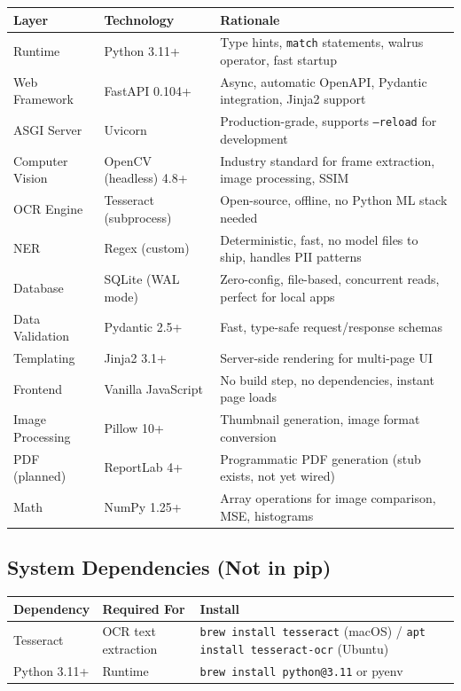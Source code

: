 \documentclass[12pt, a4paper]{article}
\newcommand{\codeinline}[1]{\texttt{\small\colorbox{codebg}{#1}}}
\begin{document}
\begin{longtable}{@{} p{3cm} p{4cm} p{7cm} @{}}
    \toprule
    \textbf{Layer} & \textbf{Technology} & \textbf{Rationale} \\
    \midrule
    \endhead
    Runtime & Python 3.11+ & Type hints, \codeinline{match} statements, walrus operator, fast startup \\
    Web Framework & FastAPI 0.104+ & Async, automatic OpenAPI, Pydantic integration, Jinja2 support \\
    ASGI Server & Uvicorn & Production-grade, supports \codeinline{--reload} for development \\
    Computer Vision & OpenCV (headless) 4.8+ & Industry standard for frame extraction, image processing, SSIM \\
    OCR Engine & Tesseract (subprocess) & Open-source, offline, no Python ML stack needed \\
    NER & Regex (custom) & Deterministic, fast, no model files to ship, handles PII patterns \\
    Database & SQLite (WAL mode) & Zero-config, file-based, concurrent reads, perfect for local apps \\
    Data Validation & Pydantic 2.5+ & Fast, type-safe request/response schemas \\
    Templating & Jinja2 3.1+ & Server-side rendering for multi-page UI \\
    Frontend & Vanilla JavaScript & No build step, no dependencies, instant page loads \\
    Image Processing & Pillow 10+ & Thumbnail generation, image format conversion \\
    PDF (planned) & ReportLab 4+ & Programmatic PDF generation (stub exists, not yet wired) \\
    Math & NumPy 1.25+ & Array operations for image comparison, MSE, histograms \\
    \bottomrule
\end{longtable}

\subsection{System Dependencies (Not in pip)}

\begin{tabularx}{\textwidth}{@{} l l X @{}}
    \toprule
    \textbf{Dependency} & \textbf{Required For} & \textbf{Install} \\
    \midrule
    Tesseract & OCR text extraction & \codeinline{brew install tesseract} (macOS) / \codeinline{apt install tesseract-ocr} (Ubuntu) \\
    Python 3.11+ & Runtime & \codeinline{brew install python@3.11} or pyenv \\
    \bottomrule
\end{tabularx}
\end{document}
